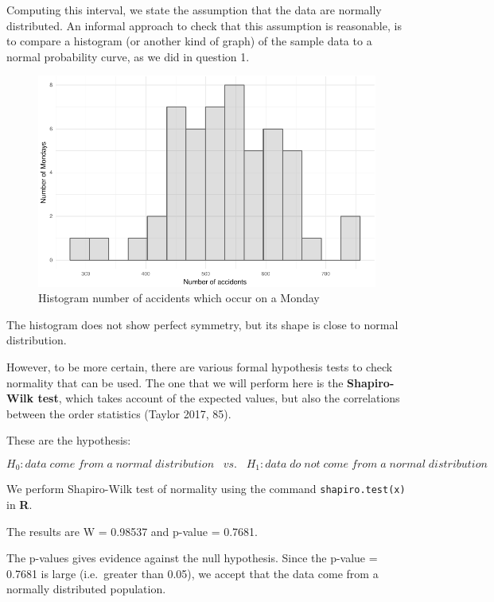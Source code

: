 \documentclass[]{article}
\begin{document}
Computing this interval, we state the assumption that the data are
normally distributed. An informal approach to check that this assumption
is reasonable, is to compare a histogram (or another kind of graph) of
the sample data to a normal probability curve, as we did in question 1.

\begin{figure}[H]

{\centering \includegraphics{README_files/figure-latex/fig5-1} 

}

\caption{Histogram number of accidents which occur on a Monday}\label{fig:fig5}
\end{figure}

The histogram does not show perfect symmetry, but its shape is close to
normal distribution.

However, to be more certain, there are various formal hypothesis tests
to check normality that can be used. The one that we will perform here
is the \textbf{Shapiro-Wilk test}, which takes account of the expected
values, but also the correlations between the order statistics (Taylor
2017, 85).

These are the hypothesis:

\[H_{0}: data\;come\;from\;a\;normal\;distribution\;\;\;vs.\;\;\;H_{1}:data\;do\;not\;come\;from\;a\;normal\;distribution\]

We perform Shapiro-Wilk test of normality using the command
\texttt{shapiro.test(x)} in \textbf{R}.

The results are W = 0.98537 and p-value = 0.7681.

The p-values gives evidence against the null hypothesis. Since the
p-value = 0.7681 is large (i.e.~greater than 0.05), we accept that the
data come from a normally distributed population.
\end{document}
